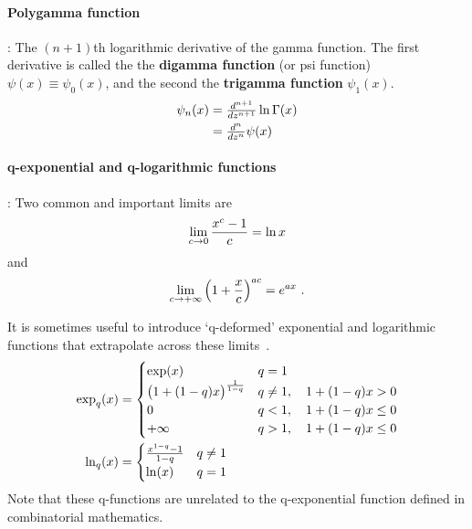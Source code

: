 \paragraph*{Polygamma function}\hspace{-0.8em}\cite{Abramowitz1965}:
The $(n+1)$th logarithmic derivative of the gam\-ma function. The first derivative is called the 
the {\bf digamma function} (or psi function) $\psi(x)\equiv\psi_0(x)$, and the second the {\bf trigamma function} $\psi_1(x)$.
\begin{align*}
	\psi_n(x)&= \tfrac{d^{n+1}}{dz^{n+1}} \ln \Gamma(x) 	
	\\ &=  \tfrac{d^{n}}{dz^{n}} \psi(x) 					
\end{align*}



\paragraph*{q-exponential and q-logarithmic functions}\hspace{-0.8em}\cite{Tsallis1994,Yamano2002}:
Two common and important limits are
\[
\lim_{c\rightarrow0} \frac{x^c -1}{c} = \ln x
\notag 
\]
and
\[
\lim_{c\rightarrow+\infty} \left(1 + \frac{x}{c} \right)^{a c} = e^{a x} \ . 
\notag
\]



It is sometimes useful to introduce `q-deformed' exponential and logarithmic functions that extrapolate across these limits~\cite{Tsallis1994,Yamano2002}.
\begin{align*}
\checked
\exp_q(x) &=  
\begin{cases}
\exp(x) & q= 1 \\
\bigl(1+ (1-q) x \bigr)^{\frac{1}{1-q} }& q\neq 1, \quad 1+(1-q)x>0 \\
0 & q< 1, \quad 1+(1-q)x\leq0 \\
+\infty & q> 1, \quad 1+(1-q)x\leq0 
\end{cases}
\\
\checked 
\ln_q(x) &=  
\begin{cases}
\frac{x^{1-q} -1}{1-q}& q\neq 1\\
\ln(x) & q= 1 \\
\end{cases}
\end{align*}
Note that these q-functions  are unrelated to the q-exponential function defined in combinatorial mathematics.


